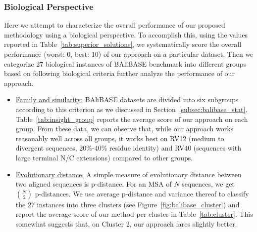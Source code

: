 \subsubsection{Biological Perspective}\label{sec:discussion}
Here we attempt to characterize the overall performance of our proposed methodology using a biological perspective. To accomplish this, using the values reported in Table~\ref{tab:superior_solutions}, we systematically score the overall performance (worst: 0, best: 10) of our approach on a particular dataset. Then we categorize 27 biological instances of BAliBASE benchmark into different groups based on following biological criteria further analyze the performance of our approach.
\begin{itemize}
	\item \underline{Family and similarity:} BAliBASE datasets are divided into six subgroups according to this criterion as we discussed in Section~\ref{subsec:balibase_stat}. Table~\ref{tab:insight_group} reports the average score of our approach on each group. From these data, we can observe that, while our approach works
	reasonably well across 
	all groups, it works best on RV12 (medium to divergent sequences, 20\%-40\% residue identity) and RV40 (sequences with large terminal N/C extensions) compared to other groups.
	
	\item \underline{Evolutionary distance:} A simple measure of evolutionary distance between two aligned sequences is p-distance. For an MSA of $N$ sequences, we get $N \choose 2$ p-distances. We use average p-distance and variance thereof to classify the 27 instances into three clusters (see Figure~\ref{fig:balibase_cluster}) and report the average score of our method per cluster in Table~\ref{tab:cluster}. This somewhat suggests that, on Cluster 2, our approach fares slightly better.
	
	
	
\end{itemize} 

